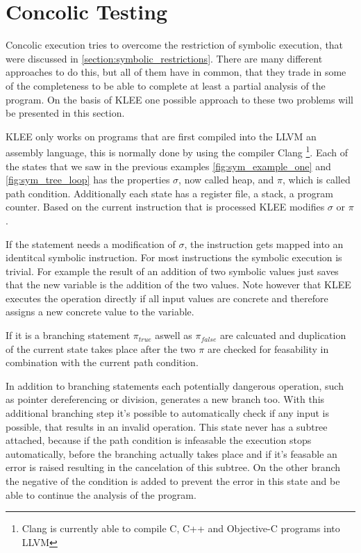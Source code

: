 \section{Concolic Testing} \label{section:concolic_testing}
Concolic execution tries to overcome the restriction of symbolic execution, that were discussed in \ref{section:symbolic_restrictions}. There are many different approaches to do this, but all of them have in common, that they trade in some of the completeness to be able to complete at least a partial analysis of the program.
On the basis of KLEE \cite{Cadar:2008:KUA:1855741.1855756} one possible approach to these two problems will be presented in this section.

KLEE only works on programs that are first compiled into the LLVM an assembly language, this is normally done by using the compiler Clang \footnote{Clang is currently able to compile C, C++  and Objective-C programs into LLVM}. 
Each of the states that we saw in the previous examples \ref{fig:sym_example_one} and \ref{fig:sym_tree_loop} has the properties $\sigma$, now called heap, and $\pi$, which is called path condition. Additionally each state has a register file, a stack, a program counter. Based on the current instruction that is processed KLEE modifies $\sigma$ or $\pi$.

If the statement needs a modification of $\sigma$, the instruction gets mapped into an identitcal symbolic instruction. For most instructions the symbolic execution is trivial. For example the result of an addition of two symbolic values just saves that the new variable is the addition of the two values. Note however that KLEE executes the operation directly if all input values are concrete and therefore assigns a new concrete value to the variable.

If it is a branching statement $\pi_{true}$ aswell as $\pi_{false}$ are calcuated and duplication of the current state takes place after the two $\pi$ are checked for feasability in combination with the current path condition.

In addition to branching statements each potentially dangerous operation, such as pointer dereferencing or division, generates a new branch too. With this additional branching step it's possible to automatically check if any input is possible, that results in an invalid operation. This state never has a subtree attached, because if the path condition is infeasable the execution stops automatically, before the branching actually takes place and if it's feasable an error is raised resulting in the cancelation of this subtree. On the other branch the negative of the condition is added to prevent the error in this state and be able to continue the analysis of the program.

